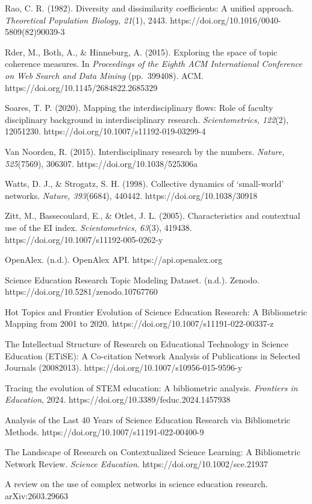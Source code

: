 \documentclass[pdflatex,sn-apa]{sn-jnl}
\begin{document}
Rao, C. R. (1982). Diversity and dissimilarity coefficients: A unified
approach. \emph{Theoretical Population Biology, 21}(1), 2443.
https://doi.org/10.1016/0040-5809(82)90039-3

Rder, M., Both, A., \& Hinneburg, A. (2015). Exploring the space of
topic coherence measures. In \emph{Proceedings of the Eighth ACM
International Conference on Web Search and Data Mining} (pp.~399408).
ACM. https://doi.org/10.1145/2684822.2685329

Soares, T. P. (2020). Mapping the interdisciplinary flows: Role of
faculty disciplinary background in interdisciplinary research.
\emph{Scientometrics, 122}(2), 12051230.
https://doi.org/10.1007/s11192-019-03299-4

Van Noorden, R. (2015). Interdisciplinary research by the numbers.
\emph{Nature, 525}(7569), 306307. https://doi.org/10.1038/525306a

Watts, D. J., \& Strogatz, S. H. (1998). Collective dynamics of
`small-world' networks. \emph{Nature, 393}(6684), 440442.
https://doi.org/10.1038/30918

Zitt, M., Bassecoulard, E., \& Otlet, J. L. (2005). Characteristics and
contextual use of the EI index. \emph{Scientometrics, 63}(3), 419438.
https://doi.org/10.1007/s11192-005-0262-y

OpenAlex. (n.d.). OpenAlex API. https://api.openalex.org

Science Education Research Topic Modeling Dataset. (n.d.). Zenodo.
https://doi.org/10.5281/zenodo.10767760

Hot Topics and Frontier Evolution of Science Education Research: A
Bibliometric Mapping from 2001 to 2020.
https://doi.org/10.1007/s11191-022-00337-z

The Intellectual Structure of Research on Educational Technology in
Science Education (ETiSE): A Co-citation Network Analysis of
Publications in Selected Journals (20082013).
https://doi.org/10.1007/s10956-015-9596-y

Tracing the evolution of STEM education: A bibliometric analysis.
\emph{Frontiers in Education}, 2024.
https://doi.org/10.3389/feduc.2024.1457938

Analysis of the Last 40 Years of Science Education Research via
Bibliometric Methods. https://doi.org/10.1007/s11191-022-00400-9

The Landscape of Research on Contextualized Science Learning: A
Bibliometric Network Review. \emph{Science Education}.
https://doi.org/10.1002/sce.21937

A review on the use of complex networks in science education research.
arXiv:2603.29663
\end{document}
